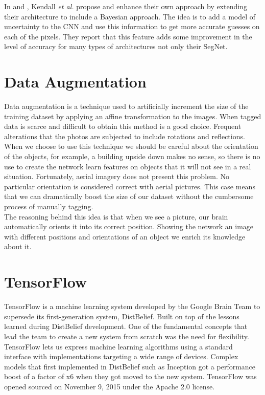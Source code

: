 In \cite{DBLP:journals/corr/KendallBC15} and \cite{DBLP:journals/corr/BadrinarayananK15}, Kendall \textit{et al.} propose and enhance their own approach by extending their architecture to include a Bayesian approach. The idea is to add a model of uncertainty to the CNN and use this information to get more accurate guesses on each of the pixels. They report that this feature adds some improvement in the level of accuracy for many types of architectures not only their SegNet.\\

\section{Data Augmentation}

Data augmentation is a technique used to artificially increment the size of the training dataset by applying an affine transformation to the images. When tagged data is scarce and difficult to obtain this method is a good choice. Frequent alterations that the photos are subjected to include rotations and reflections. When we choose to use this technique we should be careful about the orientation of the objects, for example, a building upside down makes no sense, so there is no use to create the network learn features on objects that it will not see in a real situation. Fortunately, aerial imagery does not present this problem. No particular orientation is considered correct with aerial pictures. This case means that we can dramatically boost the size of our dataset without the cumbersome process of manually tagging.\\

The reasoning behind this idea is that when we see a picture, our brain automatically orients it into its correct position. Showing the network an image with different positions and orientations of an object we enrich its knowledge about it.\\


\section{TensorFlow}

TensorFlow is a machine learning system developed by the Google Brain Team to supersede its first-generation system, DistBelief. Built on top of the lessons learned during DistBelief development. One of the fundamental concepts that lead the team to create a new system from scratch was the need for flexibility. TensorFlow lets us express machine learning algorithms using a standard interface with implementations targeting a wide range of devices. Complex models that first implemented in DistBelief such as Inception got a performance boost of a factor of x6 \cite{tensorflow2015-whitepaper} when they got moved to the new system. TensorFlow was opened sourced on November 9, 2015 under the Apache 2.0 license.\\ 

